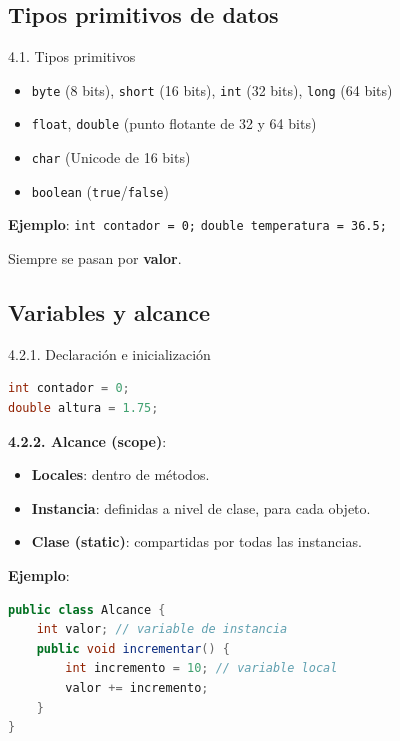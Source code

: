\documentclass{beamer}
\begin{document}
\subsection{Tipos primitivos de datos}

\begin{frame}{4.1. Tipos primitivos}
\begin{itemize}
  \item \texttt{byte} (8 bits), \texttt{short} (16 bits), \texttt{int} (32 bits), \texttt{long} (64 bits)
  \item \texttt{float}, \texttt{double} (punto flotante de 32 y 64 bits)
  \item \texttt{char} (Unicode de 16 bits)
  \item \texttt{boolean} (\texttt{true}/\texttt{false})
\end{itemize}

\textbf{Ejemplo}:
\texttt{int contador = 0;}  
\texttt{double temperatura = 36.5;}

Siempre se pasan por \textbf{valor}.
\end{frame}

\subsection{Variables y alcance}

\begin{frame}[fragile]{4.2.1. Declaración e inicialización}
\begin{lstlisting}[language=Java]
int contador = 0;
double altura = 1.75;
\end{lstlisting}

\textbf{4.2.2. Alcance (scope)}:
\begin{itemize}
  \item \textbf{Locales}: dentro de métodos.
  \item \textbf{Instancia}: definidas a nivel de clase, para cada objeto.
  \item \textbf{Clase (static)}: compartidas por todas las instancias.
\end{itemize}

\textbf{Ejemplo}:
\begin{lstlisting}[language=Java]
public class Alcance {
    int valor; // variable de instancia
    public void incrementar() {
        int incremento = 10; // variable local
        valor += incremento;
    }
}
\end{lstlisting}
\end{frame}
\end{document}
